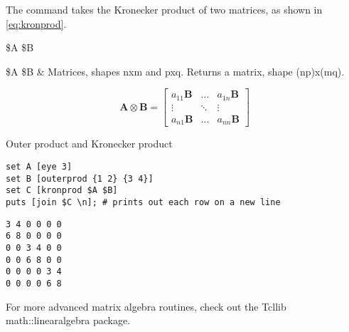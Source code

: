 \documentclass{article}
\begin{document}
The command  takes the Kronecker product of two matrices, as shown in \eq\eqref{eq:kronprod}.
\begin{syntax}
 \$A \$B
\end{syntax}
\begin{args}
\$A \$B & Matrices, shapes nxm and pxq. Returns a matrix, shape (np)x(mq).
\end{args}
\begin{equation}\label{eq:kronprod}
\bm{A} \otimes \bm{B} = \left[\begin{matrix}
a_{11}\bm{B} & ... & a_{1n}\bm{B} \\
\vdots & \ddots & \vdots \\
a_{n1}\bm{B} & ... & a_{nn}\bm{B}
\end{matrix}\right]
\end{equation}
\begin{example}{Outer product and Kronecker product}
\begin{lstlisting}
set A [eye 3]
set B [outerprod {1 2} {3 4}]
set C [kronprod $A $B]
puts [join $C \n]; # prints out each row on a new line
\end{lstlisting}
\tcblower
\begin{lstlisting}
3 4 0 0 0 0
6 8 0 0 0 0
0 0 3 4 0 0
0 0 6 8 0 0
0 0 0 0 3 4
0 0 0 0 6 8
\end{lstlisting}
\end{example}
For more advanced matrix algebra routines, check out the Tcllib math::linearalgebra package.
\clearpage
\end{document}
